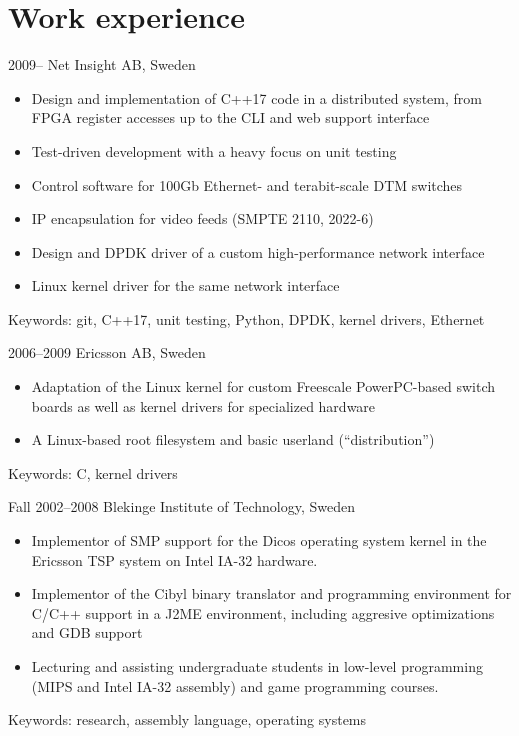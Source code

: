 \documentclass[a4paper]{article}
\begin{document}
\section{Work experience}

\begin{CV}
\item[2009--] Net Insight AB, Sweden
  \begin{itemize}
    \item Design and implementation of C++17 code in a distributed system, from FPGA 
      register accesses up to the CLI and web support interface
    \item Test-driven development with a heavy focus on unit testing
    \item Control software for 100Gb Ethernet- and terabit-scale DTM switches
    \item IP encapsulation for video feeds (SMPTE 2110, 2022-6)
    \item Design and DPDK driver of a custom high-performance network interface
    \item Linux kernel driver for the same network interface
  \end{itemize}
Keywords: git, C++17, unit testing, Python, DPDK, kernel drivers, Ethernet

\item[2006--2009] Ericsson AB, Sweden

  \begin{itemize}
  \item Adaptation of the Linux kernel for custom Freescale PowerPC-based
    switch boards as well as kernel drivers for specialized hardware
  \item A Linux-based root filesystem and basic userland (``distribution'')
  \end{itemize}
Keywords: C, kernel drivers

\item[Fall 2002--2008] Blekinge Institute of Technology, Sweden

  \begin{itemize}
  \item Implementor of SMP support for the Dicos operating system
    kernel in the Ericsson TSP system on Intel IA-32 hardware.
  \item Implementor of the Cibyl binary translator and programming environment
    for C/C++ support in a J2ME environment, including aggresive optimizations
    and GDB support
  \item Lecturing and assisting undergraduate students in low-level
    programming (MIPS and Intel IA-32 assembly) and game programming courses.
  \end{itemize}
Keywords: research, assembly language, operating systems


\end{CV}
\end{document}

